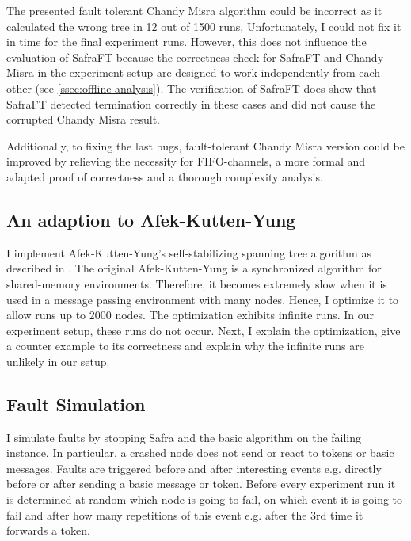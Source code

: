 The presented fault tolerant Chandy Misra algorithm could be incorrect as it calculated the wrong tree in 12 out of 1500 runs, 
Unfortunately, I could not fix it in time for the final experiment runs. 
However, this does not influence the evaluation of SafraFT because the correctness check for SafraFT and Chandy Misra in the experiment setup are designed to work independently from each other (see \cref{ssec:offline-analysis}).
The verification of SafraFT does show that SafraFT detected termination correctly in these cases and did not cause the corrupted Chandy Misra result.

Additionally, to fixing the last bugs, fault-tolerant Chandy Misra version could be improved by relieving the necessity for FIFO-channels, a more formal and adapted proof of correctness and a thorough complexity analysis. 


\subsection{An adaption to Afek-Kutten-Yung}
I implement Afek-Kutten-Yung's self-stabilizing spanning tree algorithm as described in \cite[page 183ff]{fokkink:2018}.
The original Afek-Kutten-Yung is a synchronized algorithm for shared-memory environments.
Therefore, it becomes extremely slow when it is used in a message passing environment with many nodes.
Hence, I optimize it to allow runs up to 2000 nodes.
The optimization exhibits infinite runs.
In our experiment setup, these runs do not occur. 
Next, I explain the optimization, give a counter example to its correctness and explain why the infinite runs are unlikely in our setup.



\subsection{Fault Simulation}
I simulate faults by stopping Safra and the basic algorithm on the failing instance.
In particular, a crashed node does not send or react to tokens or basic messages.
Faults are triggered before and after interesting events e.g. directly before or after sending a basic message or token. 
Before every experiment run it is determined at random which node is going to fail, on which event it is going to fail and after how many repetitions of this event e.g. after the 3rd time it forwards a token.

